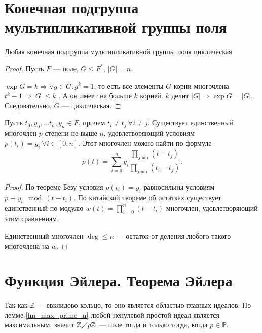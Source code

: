 \documentclass[11pt]{book}
\newcommand{\Z}{\mathbb{Z}}
\newcommand{\Pm}{\mathbb{P}}
\newcommand{\po}{\diagup}
\renewcommand{\le}{\leqslant}
\theoremstyle{definition}
\theoremstyle{plain}
\theoremstyle{plain}
\theoremstyle{definition}
\theoremstyle{remark}
\begin{document}
 \section{Конечная подгруппа мультипликативной группы поля}
 \begin{thm}\label{th_end}
      Любая конечная подгруппа мультипликативной группы поля циклическая.
 \end{thm}
 \begin{proof}
    Пусть $ F$ --- поле, $ G \le F^{*}$, $ |G| =n $.

     $ \exp G = k \Longrightarrow \forall g \in  G: g^{k } = 1$, то есть все элементы $ G$ корни многочлена $ t ^{k} -1 \Longrightarrow  |G| \le k$ . А он имеет на больше  $ k$ корней. 
     $ k$ делит  $ |G| \Longrightarrow  \exp G = |G|$. Следовательно, $ G$ --- циклическая. 
 \end{proof}
 \begin{thm}
     Пусть $ t_0, y_0, \ldots t_n, y_n \in F$, причем $ t_i \ne  t_j ~ \forall i \ne j$. Существует единственный многочлен $ p$ степени не выше  $ n$, удовлетворяющий условиям  $ p(t_i) = y_i ~ \forall i \in [0, n]$. Этот многочлен можно найти по формуле
     \[
	 p(t) = \sum_{i = 0}^{n} y_i \frac{\prod_{j \ne  i}(t-t_j)}{\prod_{j \ne  i}(t_i - t_j)}
     .\] 
 \end{thm}
 \begin{proof}
     По теореме Безу условия $ p(t_i) = y_i $  равносильны условиям  $ p \equiv y_{i} \mod (t - t_i)$. По китайской теореме об остатках существует единственный по модулю $ w(t) = \prod\limits_{i = 0}^{n}(t-t_i)$ многочлен, удовлетворяющий этим сравнениям.

     Единственный многочлен $ \deg \le n $ --- остаток от деления любого такого многочлена на $ w$.
 \end{proof}
 \section{Функция Эйлера. Теорема Эйлера}
 Так как $ \Z$  --- евклидово кольцо, то оно является областью главных идеалов. По лемме \ref{lm_max_prime_n} любой ненулевой простой идеал является максимальным, значит $ \Z \po p\Z$ --- поле  тогда и только тогда, когда $ p \in \Pm$.
\end{document}
